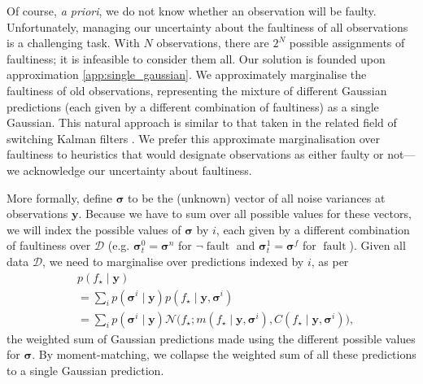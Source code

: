 \documentclass[letterpaper]{article}
\newcommand{\given}{\!\ensuremath{\mid}\!}
\newcommand{\cm}[1]{\ensuremath{\mathcal{#1}}}
\newcommand{\bm}[1]{\ensuremath{\mathbf{#1}}}
\newcommand{\data}{\ensuremath{\cm{D}}}
\newcommand{\vect}[1]{\bm{#1}}
\newcommand{\vy}{\vect{y}}
\newcommand{\vs}{\vect{\sigma}}
\newcommand{\p}[2]{p(#1\given#2)}
\newcommand{\fPr}{p}
\newcommand{\Prob}[2]{\fPr(#1 \given #2 )}
\newcommand{\mean}[2]{{m}(#1\given#2)}
\newcommand{\cov}[2]{{C}(#1\given#2)}
\newcommand{\st}{_{\star}}
\DeclareMathOperator{\fault}{fault}
\begin{document}
Of course, {\it a priori}, we do not know whether an
observation will be faulty.  Unfortunately, managing our uncertainty
about the faultiness of all observations is a
challenging task. With $N$ observations, there are $2^N$
possible assignments of faultiness; it is infeasible to consider them all. Our solution is founded upon approximation \ref{app:single_gaussian}. We approximately marginalise the faultiness of old observations, representing the mixture of different Gaussian predictions (each given by a different combination of faultiness) as a single Gaussian. This natural approach is similar to that taken in the related field of switching Kalman filters \cite{murphy1998switching}. We prefer this approximate marginalisation over
faultiness to heuristics that would designate
observations as either faulty or not---we acknowledge our
uncertainty about faultiness. 

More formally, define $\vs$ to be the (unknown) vector of
all noise variances at observations $\vy$. Because we have to sum over all possible values for these
vectors, we will index the possible values of
$\vs$ by $i$, each given by a different combination of
faultiness over $\data$ (e.g. $\vs_t^0=\vs^n$ for $\neg\fault$ and $\vs_t^1=\vs^f$ for $\fault$).
Given all data $\data$, we need to marginalise over predictions indexed by $i$, as per
\begin{align}
& \p{f\st}{\vy} \nonumber\\
& = \sum_{i} \Prob{\vs^i}{\vy} \p{f\st}{\vy, \vs^{i}} \nonumber\\
& =\sum_{i} \Prob{\vs^i}{\vy} \cm{N}\bigl(f\st; \mean{f\st}{\vy, \vs^{i}}, \cov{f\st}{\vy, \vs^{i}}\bigr),\label{eq:Gaussian_marginal}
\end{align}
the weighted sum of Gaussian predictions made using the different
possible values for $\vs$. By moment-matching, we collapse the weighted sum of all these predictions to a single Gaussian prediction. 
\end{document}
